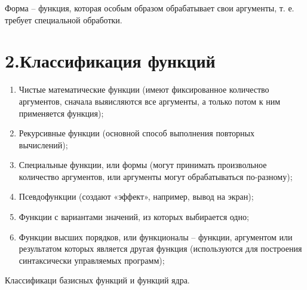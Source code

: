 \documentclass[12pt]{report}
\begin{document}
Форма -- функция, которая особым образом обрабатывает свои аргументы, т. е. требует специальной обработки.




\section*{2.Классификация функций}


\begin{enumerate}
	\item Чистые  математические функции (имеют фиксированное количество аргументов, сначала выяисляются все аргументы, а только потом к ним применяется функция);
	\item Рекурсивные функции (основной способ выполнения повторных вычислений);
	\item Специальные функции, или формы (могут принимать произвольное количество аргументов, или аргументы могут обрабатываться по-разному);
	\item Псевдофункции (создают «эффект», например, вывод на экран);
	\item Функции с вариантами значений, из которых выбирается одно;
	\item Функции высших порядков, или функционалы --  функции, аргументом или  результатом которых является другая функция (используются для построения синтаксически управляемых программ);
\end{enumerate}

Классификаци базисных функций и функций ядра.
\end{document}
